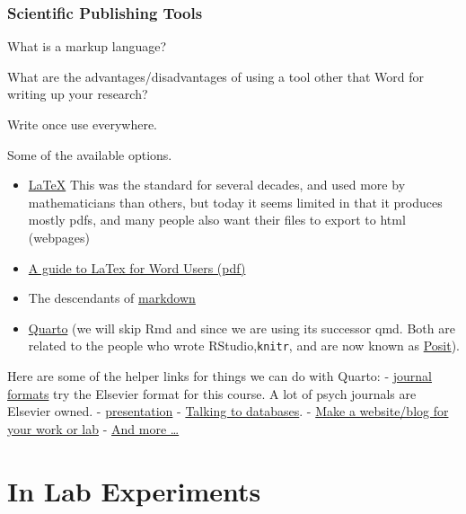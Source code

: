 \documentclass[
  letterpaper,
  DIV=11,
  numbers=noendperiod]{scrreprt}
\providecommand{\tightlist}{%
  \setlength{\itemsep}{0pt}\setlength{\parskip}{0pt}}\usepackage{longtable,booktabs,array}
\begin{document}
\subsection{Scientific Publishing
Tools}\label{scientific-publishing-tools}

What is a markup language?

What are the advantages/disadvantages of using a tool other that Word
for writing up your research?

Write once use everywhere.

Some of the available options.

\begin{itemize}
\tightlist
\item
  \href{https://www.latex-project.org/}{LaTeX} This was the standard for
  several decades, and used more by mathematicians than others, but
  today it seems limited in that it produces mostly pdfs, and many
  people also want their files to export to html (webpages)
\item
  \href{https://ctan.math.washington.edu/tex-archive/info/latex4wp/latex4wp.pdf}{A
  guide to LaTex for Word Users (pdf)}
\item
  The descendants of
  \href{https://en.wikipedia.org/wiki/Markdown}{markdown}
\item
  \href{https://quarto.org/}{Quarto} (we will skip Rmd and since we are
  using its successor qmd. Both are related to the people who wrote
  RStudio,\texttt{knitr}, and are now known as
  \href{https://posit.co/}{Posit}).
\end{itemize}

Here are some of the helper links for things we can do with Quarto: -
\href{https://quarto.org/docs/journals/}{journal formats} try the
Elsevier format for this course. A lot of psych journals are Elsevier
owned. -
\href{https://jjallaire.quarto.pub/reproducible-manuscripts-with-quarto/\#/title-slide}{presentation}
-
\href{https://danielroelfs.com/blog/sql-notebooks-with-quarto/}{Talking
to databases}. -
\href{https://beamilz.com/posts/2022-06-05-creating-a-blog-with-quarto/en/}{Make
a website/blog for your work or lab} -
\href{https://github.com/mcanouil/awesome-quarto?tab=readme-ov-file}{And
more \ldots{}}


\chapter{In Lab Experiments}\label{in-lab-experiments}
\end{document}
